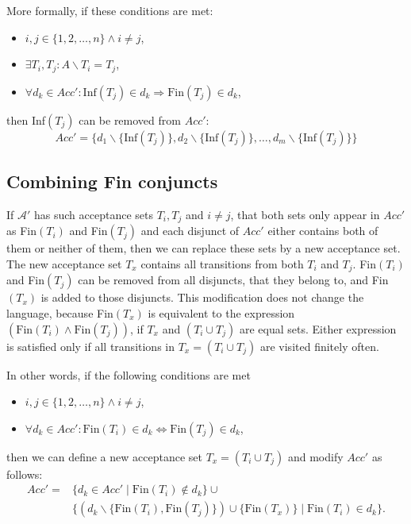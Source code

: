 \documentclass[
  digital, %
  twoside, %
  table,   %
  lof,     %
  lot,     %
]{fithesis3}
\begin{document}
More formally, if these conditions are met:
\begin{itemize}
  \item $i, j \in \{1, 2, \dots, n\} \wedge i \neq j$,
  \item $\exists T_i, T_j \colon A \smallsetminus T_i = T_j$,
  \item $\forall d_k \in Acc' \colon \text{Inf}(T_j) \in d_k \Rightarrow \text{Fin}(T_j) \in d_k$,
\end{itemize}
then Inf$(T_j)$ can be removed from $Acc'$:
\begin{equation*}
  Acc' = \{d_1 \smallsetminus \{\text{Inf}(T_j)\}, d_2 \smallsetminus \{\text{Inf}(T_j)\}, \dots, d_m \smallsetminus \{\text{Inf}(T_j)\} \}
\end{equation*}

\subsection{Combining Fin conjuncts}
If $\mathcal{A'}$ has such acceptance sets $T_i, T_j$ and $i \neq j$, that both sets only appear in $Acc'$ as Fin$(T_i)$ and Fin$(T_j)$ and each disjunct of $Acc'$ either contains both of them or neither of them, then we can replace these sets by a new acceptance set. The new acceptance set $T_x$ contains all transitions from both $T_i$ and $T_j$. Fin$(T_i)$ and Fin$(T_j)$ can be removed from all disjuncts, that they belong to, and Fin$(T_x)$ is added to those disjuncts. This modification does not change the language, because Fin$(T_x)$ is equivalent to the expression $(\text{Fin}(T_i) \wedge \text{Fin}(T_j))$, if $T_x$ and $(T_i \cup T_j)$ are equal sets. Either expression is satisfied only if all transitions in $T_x = (T_i \cup T_j)$ are visited finitely often.

In other words, if the following conditions are met
\begin{itemize}
  \item $i, j \in \{1, 2, \dots, n\} \wedge i \neq j$,
  \item $\forall d_k \in Acc' \colon \text{Fin}(T_i) \in d_k \Leftrightarrow \text{Fin}(T_j) \in d_k$,
\end{itemize}
then we can define a new acceptance set $T_x = (T_i \cup T_j)$ and modify $Acc'$ as follows: 
\begin{align*}
  Acc' =& \{d_k \in Acc' \mid \text{Fin}(T_i) \notin d_k\} \cup \\ &\{(d_k \smallsetminus \{\text{Fin}(T_i), \text{Fin}(T_j)\}) \cup \{\text{Fin}(T_x)\} \mid \text{Fin}(T_i) \in d_k\}.
\end{align*}
\end{document}
